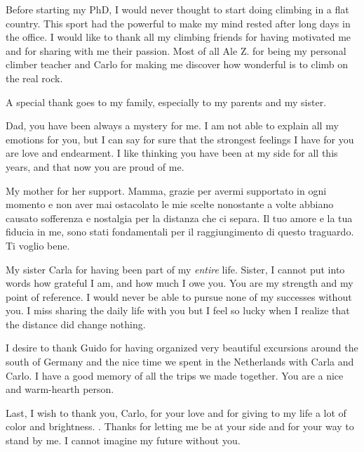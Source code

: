Before starting my PhD, I would never thought to start doing climbing in a flat country. This sport had the powerful to make my mind rested after long days in the office.
I would like to thank all my climbing friends for having motivated me and for sharing with me their passion. Most of all Ale Z. for being my personal climber teacher and Carlo for making me discover how wonderful is to climb on the real rock. 

A special thank goes to my family, especially to my parents and my sister.

Dad, you have been always a mystery for me. I am not able to explain all my emotions for you, but I can say for sure that the strongest feelings I have for you are love and endearment. I like thinking you have been at my side for all this years, and that now you are proud of me.

My mother for her support. Mamma, grazie per avermi supportato in ogni momento e non aver mai ostacolato le mie scelte nonostante a volte abbiano causato sofferenza e nostalgia per la distanza che ci separa. Il tuo amore e la tua fiducia in me, sono stati fondamentali per il raggiungimento di questo traguardo. Ti voglio bene.   

My sister Carla for having been part of my \textit{entire} life. Sister, I cannot put into words how grateful I am, and how much I owe you. You are my strength and my point of reference. I would never be able to pursue none of my successes without you.
I miss sharing the daily life with you but I feel so lucky when I realize that the distance did change nothing. 

I desire to thank Guido for having organized very beautiful excursions around the south of Germany and the nice time we spent in the Netherlands with Carla and Carlo. I have a good memory of all the trips we made together. You are a nice and warm-hearth person.

Last, I wish to thank you, Carlo, for your love and for giving to my life a lot of color and brightness. .
Thanks for letting me be at your side and for your way to stand by me. I cannot imagine my future without you.
\clearpage{\pagestyle{empty}\cleardoublepage}
